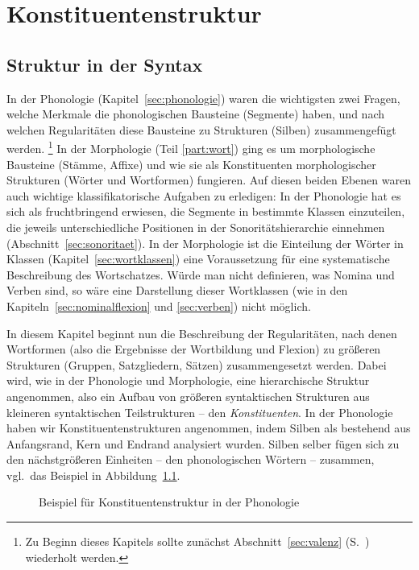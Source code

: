 \chapter{Konstituentenstruktur}

\label{sec:konstituentenstruktur}

\section{Struktur in der Syntax}

In der Phonologie (Kapitel~\ref{sec:phonologie}) waren die wichtigsten zwei Fragen, welche Merkmale die phonologischen Bausteine (Segmente) haben, und nach welchen Regularitäten diese Bausteine zu Strukturen (\zB Silben) zusammengefügt werden.%
\footnote{Zu Beginn dieses Kapitels sollte zunächst Abschnitt~\ref{sec:valenz} (S.~\pageref{sec:valenz}) wiederholt werden.}
In der Morphologie (Teil \ref{part:wort}) ging es um morphologische Bausteine (Stämme, Affixe) und wie sie als Konstituenten morphologischer Strukturen (Wörter und Wortformen) fungieren.
Auf diesen beiden Ebenen waren auch wichtige klassifikatorische Aufgaben zu erledigen:
In der Phonologie hat es sich \zB als fruchtbringend erwiesen, die Segmente in bestimmte Klassen einzuteilen, die jeweils unterschiedliche Positionen in der Sonoritätshierarchie einnehmen (Abschnitt~\ref{sec:sonoritaet}).
In der Morphologie ist die Einteilung der Wörter in Klassen (Kapitel~\ref{sec:wortklassen}) eine Voraussetzung für eine systematische Beschreibung des Wortschatzes.
Würde man nicht definieren, was \zB Nomina und Verben sind, so wäre eine Darstellung dieser Wortklassen (wie in den Kapiteln~\ref{sec:nominalflexion} und \ref{sec:verben}) nicht möglich.

In diesem Kapitel beginnt nun die Beschreibung der Regularitäten, nach denen Wortformen (also die Ergebnisse der Wortbildung und Flexion) zu größeren Strukturen (Gruppen, Satzgliedern, Sätzen) zusammengesetzt werden.
Dabei wird, wie in der Phonologie und Morphologie, eine hierarchische Struktur angenommen, also ein Aufbau von größeren syntaktischen Strukturen aus kleineren syntaktischen Teilstrukturen -- den \textit{Konstituenten}.
In der Phonologie haben wir Konstituentenstrukturen angenommen, indem \zB Silben als bestehend aus Anfangsrand, Kern und Endrand analysiert wurden.
Silben selber fügen sich zu den nächstgrößeren Einheiten -- den phonologischen Wörtern -- zusammen, vgl.\ das Beispiel in Abbildung~\ref{fig:phonstr-rev}.

\begin{figure}
  \centering
  \ThePhonStr
  \caption{Beispiel für Konstituentenstruktur in der Phonologie}
  \label{fig:phonstr-rev}
\end{figure}

